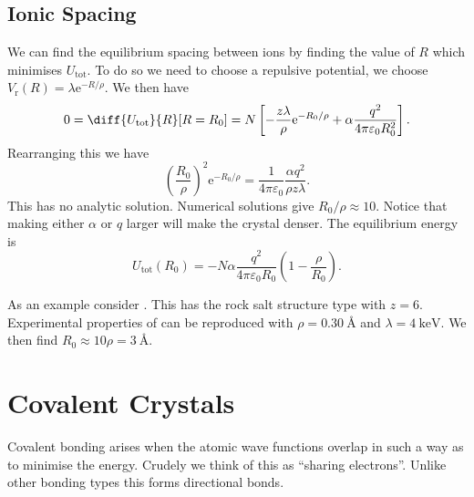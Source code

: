\documentclass[fleqn]{NotesClass}
\newcommand*{\e}{\mathrm{e}}
\newcommand*{\tot}{\mathrm{tot}}
\begin{document}
    \subsection{Ionic Spacing}
    We can find the equilibrium spacing between ions by finding the value of \(R\) which minimises \(U_{\tot}\).
    To do so we need to choose a repulsive potential, we choose \(V_{\mathrm{r}}(R) = \lambda\e^{-R/\rho}\).
    We then have
    \begin{equation}
        0 = \diff{U_{\tot}}{R}[R=R_0] = N\left[ -\frac{z\lambda}{\rho}\e^{-R_0/\rho} + \alpha\frac{q^2}{4\pi\varepsilon_0R_0^2} \right].
    \end{equation}
    Rearranging this we have
    \begin{equation}
        \left( \frac{R_0}{\rho} \right)^{2} \e^{-R_0/\rho} = \frac{1}{4\pi\varepsilon_0}\frac{\alpha q^2}{\rho z\lambda}.
    \end{equation}
    This has no analytic solution.
    Numerical solutions give \(R_0/\rho \approx 10\).
    Notice that making either \(\alpha\) or \(q\) larger will make the crystal denser.
    The equilibrium energy is
    \begin{equation}
        U_{\tot}(R_0) = -N\alpha\frac{q^2}{4\pi\varepsilon_0R_0}\left( 1 - \frac{\rho}{R_0} \right).
    \end{equation}
    
    As an example consider .
    This has the rock salt structure type with \(z = 6\).
    Experimental properties of  can be reproduced with \(\rho = \qty{0.30}{\angstrom}\) and \(\lambda = \qty{4}{\kilo\electronvolt}\).
    We then find \(R_0 \approx 10\rho = \qty{3}{\angstrom}\).
    
    \section{Covalent Crystals}
    Covalent bonding arises when the atomic wave functions overlap in such a way as to minimise the energy.
    Crudely we think of this as \enquote{sharing electrons}.
    Unlike other bonding types this forms directional bonds.
    
\end{document}
